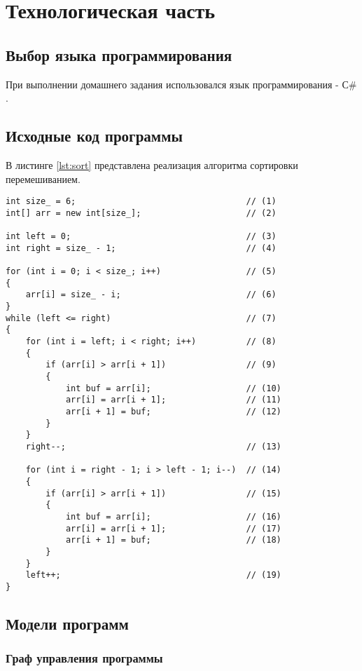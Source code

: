 \chapter{Технологическая часть}

\section{Выбор языка программирования}

При выполнении домашнего задания использовался язык программирования - С\# \cite{csharplang}.


\section{Исходные код программы}
В листинге \ref{lst:sort} представлена реализация алгоритма сортировки перемешиванием.


\begin{lstlisting}[label=lst:sort,caption=Алгоритм ранговой сортировки (обычный)]
int size_ = 6;                                  // (1)
int[] arr = new int[size_];                     // (2)

int left = 0;                                   // (3)
int right = size_ - 1;                          // (4)

for (int i = 0; i < size_; i++)                 // (5)
{
	arr[i] = size_ - i;                         // (6)
}
while (left <= right)                           // (7)
{
	for (int i = left; i < right; i++)          // (8)
	{
		if (arr[i] > arr[i + 1])                // (9)
		{
			int buf = arr[i];                   // (10)
			arr[i] = arr[i + 1];                // (11)
			arr[i + 1] = buf;                   // (12)
		}
	}
	right--;                                    // (13)
	
	for (int i = right - 1; i > left - 1; i--)  // (14)
	{   
		if (arr[i] > arr[i + 1])                // (15)
		{
			int buf = arr[i];                   // (16)
			arr[i] = arr[i + 1];                // (17)
			arr[i + 1] = buf;                   // (18)
		}
	}
	left++;                                     // (19)
}
\end{lstlisting}

\section{Модели программ}

\subsection{Граф управления программы}

